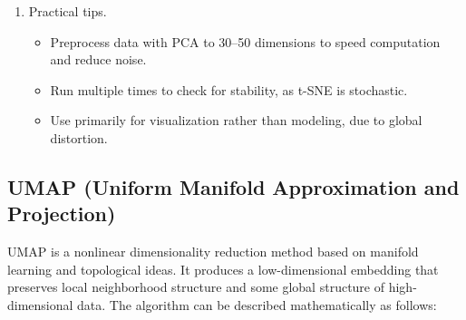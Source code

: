 \documentclass{article}
\begin{document}
\begin{enumerate}
where
\begin{itemize}
\item $y_i^{(t)}$ is the coordinate of point $i$ at iteration $t$,
\item $\eta$ is the learning rate,
\item $\frac{\partial \text{KL}(P\|Q)}{\partial y_i}$ is the gradient of the KL divergence with respect to $y_i$, indicating the direction in which to move $y_i$ to reduce divergence.
\end{itemize}

\item Practical tips.  

\begin{itemize}
\item Preprocess data with PCA to 30--50 dimensions to speed computation and reduce noise.  
\item Run multiple times to check for stability, as t-SNE is stochastic.  
\item Use primarily for visualization rather than modeling, due to global distortion.
\end{itemize}

\end{enumerate}

\subsection*{UMAP (Uniform Manifold Approximation and Projection)}

UMAP is a nonlinear dimensionality reduction method based on manifold learning and topological ideas. It produces a low-dimensional embedding that preserves local neighborhood structure and some global structure of high-dimensional data. The algorithm can be described mathematically as follows:
\end{document}
